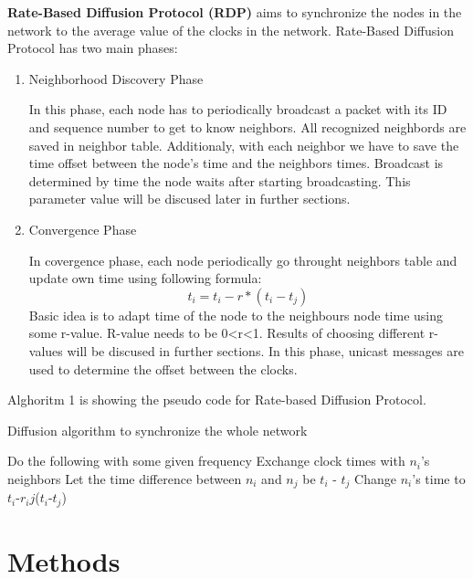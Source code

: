 \documentclass{llncs}
\begin{document}
 \textbf{Rate-Based Diffusion Protocol (RDP)} aims to synchronize the nodes in the network to the average value of the clocks in the network.
Rate-Based Diffusion Protocol has two main phases:
\begin{enumerate}
\item  Neighborhood Discovery Phase

In this phase, each node has to periodically broadcast a packet with its ID and sequence number to get to know neighbors. All recognized neighbords are saved in neighbor table. Additionaly, with each neighbor we have to save the time offset between the node's time and the neighbors times. Broadcast is determined by time the node waits after starting broadcasting. This parameter value will be discused later in further sections. 

\item  Convergence Phase

In covergence phase, each node periodically go throught neighbors table and update own time using following formula:
\[t_i= t_i -  r * (t_i-t_j)\]
Basic idea is to adapt time of the node to the neighbours node time using some r-value.
R-value needs to be 0\textless r\textless 1. Results of choosing different r-values will be discused in further sections. 
In this phase, unicast messages are used to determine the offset between the clocks.  
\end{enumerate}
\pagebreak 
Alghoritm 1 is showing the pseudo code for Rate-based Diffusion Protocol. 
\begin{algorithm}
 \caption{Diffusion algorithm to synchronize the whole network}\label{euclid}
  \begin{algorithmic}[1]
    \STATE Do the following with some given frequency
     \STATE Exchange clock times with $n_i$'s neighbors
        \STATE Let the time difference between $n_i$ and $n_j$ be $t_i$ - $t_j$
        \STATE Change $n_i$'s time to $t_i$-$r_ij$($t_i$-$t_j$)
      \ENDFOR
    \ENDFOR
\end{algorithmic}
\end{algorithm}

\begin{comment}
Methods: especially, describe the methods used to realize the protocol
(functions in the code and their functionality).
\end{comment}
\section{Methods}
\end{document}
